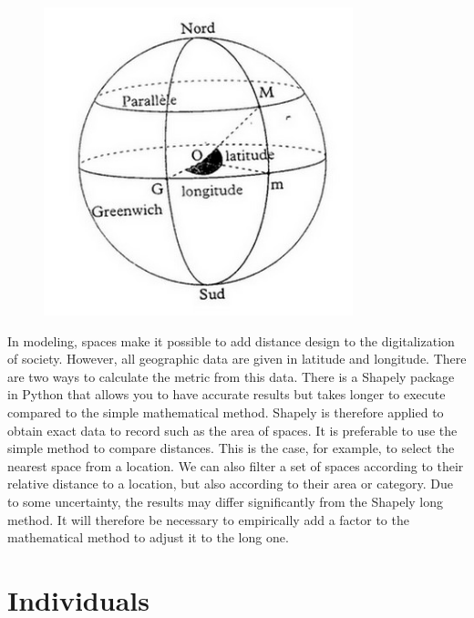 \begin{figure}
  \centering
  \includegraphics[width=\linewidth]{Media/Geographie.png}
\end{figure}

In modeling, spaces make it possible to add
distance design to the digitalization of society. However, all geographic data are given in latitude and longitude. There are two ways to calculate the metric from this data. There is a Shapely package in Python that allows you to have accurate results but takes longer to execute compared to the simple mathematical method. Shapely is therefore applied to obtain exact data to record such as the area of spaces. It is preferable to use the simple method to compare distances. This is the case, for example, to select the nearest space from a location. We can also filter a set of spaces according to their relative distance to a location, but also according to their area or category. Due to some uncertainty, the results may differ significantly from the Shapely long method. It will therefore be necessary to empirically add a factor to the mathematical method to adjust it to the long one.\\

\newpage

\section{Individuals}

